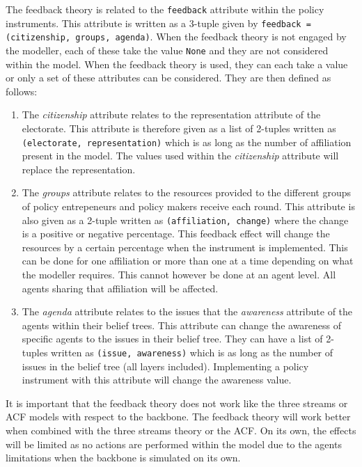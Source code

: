 The feedback theory is related to the \texttt{feedback} attribute within the policy instruments. This attribute is written as a 3-tuple given by \texttt{feedback = (citizenship, groups, agenda)}. When the feedback theory is not engaged by the modeller, each of these take the value \texttt{None} and they are not considered within the model. When the feedback theory is used, they can each take a value or only a set of these attributes can be considered. They are then defined as follows:

\begin{enumerate}
\item The \emph{citizenship} attribute relates to the representation attribute of the electorate. This attribute is therefore given as a list of 2-tuples written as \texttt{(electorate, representation)} which is as long as the number of affiliation present in the model. The values used within the \emph{citizenship} attribute will replace the representation.
\item The \emph{groups} attribute relates to the resources provided to the different groups of policy entrepeneurs and policy makers receive each round. This attribute is also given as a 2-tuple written as \texttt{(affiliation, change)} where the change is a positive or negative percentage. This feedback effect will change the resources by a certain percentage when the instrument is implemented. This can be done for one affiliation or more than one at a time depending on what the modeller requires. This cannot however be done at an agent level. All agents sharing that affiliation will be affected.
\item The \emph{agenda} attribute relates to the issues that the \emph{awareness} attribute of the agents within their belief trees. This attribute can change the awareness of specific agents to the issues in their belief tree. They can have a list of 2-tuples written as \texttt{(issue, awareness)} which is as long as the number of issues in the belief tree (all layers included). Implementing a policy instrument with this attribute will change the awareness value.
\end{enumerate}

It is important that the feedback theory does not work like the three streams or ACF models with respect to the backbone. The feedback theory will work better when combined with the three streams theory or the ACF. On its own, the effects will be limited as no actions are performed within the model due to the agents limitations when the backbone is simulated on its own. 

